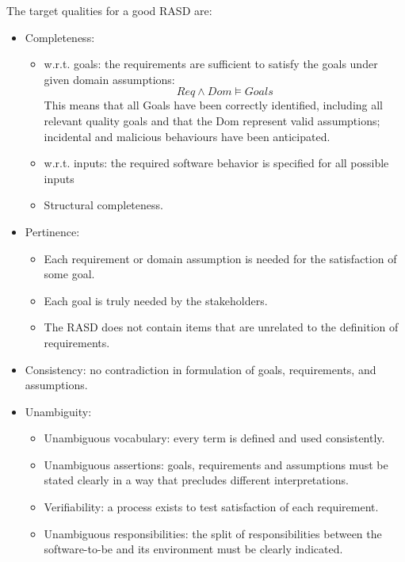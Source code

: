 \documentclass[12pt, a4paper]{report}
\begin{document}
        \par
        The target qualities for a good RASD are: 
        \begin{itemize}
            \item Completeness:
            \begin{itemize}
                \item w.r.t. goals: the requirements are sufficient to satisfy the goals under given domain assumptions: 
                \[Req \land Dom \models Goals\]
                This means that all Goals have been correctly identified, including all relevant quality goals and that the Dom represent valid assumptions; incidental and malicious behaviours have been anticipated. 
                \item w.r.t. inputs: the required software behavior is specified for all possible inputs
                \item Structural completeness. 
            \end{itemize}
            \item Pertinence: 
            \begin{itemize}
                \item Each requirement or domain assumption is needed for the satisfaction of some goal. 
                \item Each goal is truly needed by the stakeholders. 
                \item The RASD does not contain items that are unrelated to the definition of requirements.
            \end{itemize}
            \item Consistency: no contradiction in formulation of goals, requirements, and assumptions. 
            \item Unambiguity: 
            \begin{itemize}
                \item Unambiguous vocabulary: every term is defined and used consistently.
                \item Unambiguous assertions: goals, requirements and assumptions must be stated clearly in a way that precludes different interpretations.
                \item Verifiability: a process exists to test satisfaction of each requirement.
                \item Unambiguous responsibilities: the split of responsibilities between the software-to-be and its environment must be clearly indicated. 
            \end{itemize}

\end{itemize}
\end{document}
